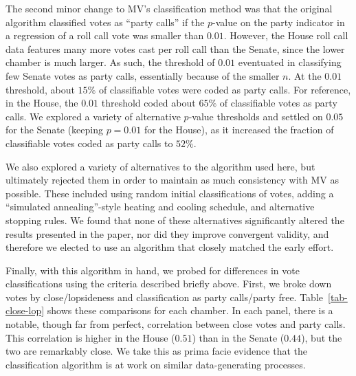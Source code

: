 \documentclass[12pt]{article}
\begin{document}
The second minor change to MV's classification method was that the original algorithm classified votes as ``party calls'' if the $p$-value on the party indicator in a regression of a roll call vote was smaller than $0.01$.  However, the House roll call data features many more votes cast per roll call than the Senate, since the lower chamber is much larger.  As such, the threshold of $0.01$ eventuated in classifying few
Senate votes as party calls, essentially because of the smaller $n$.
At the $0.01$ threshold, about $15\%$ of classifiable votes were coded as party calls.
For reference, in the House, the $0.01$ threshold coded about $65\%$ of classifiable votes as party calls.
We explored a variety of alternative $p$-value thresholds and settled on $0.05$ for the Senate (keeping $p = 0.01$ for the House), as it
increased the fraction of classifiable votes coded as party calls to $52\%$.

We also explored a variety of alternatives to the algorithm used here, but ultimately rejected them in order to maintain as much consistency with MV as possible.  These included using random initial classifications of votes, adding a ``simulated annealing''-style heating and cooling schedule, and alternative stopping rules.  We found that none of these alternatives significantly altered the results presented in the paper, nor did they improve convergent validity, and therefore we elected to use an algorithm that closely matched the early effort.

Finally, with this algorithm in hand, we probed for differences in vote classifications using the criteria described briefly above.  First, we broke down votes by close/lopsideness and classification as party calls/party free.  Table~\ref{tab-close-lop} shows these comparisons for each chamber. In each panel, there is a notable, though far from perfect, correlation between close votes and party calls.  This correlation is higher in the House ($0.51$) than in the Senate ($0.44$), but the two are remarkably close.  We take this as prima facie evidence that the classification algorithm is at work on similar data-generating processes.
\end{document}
